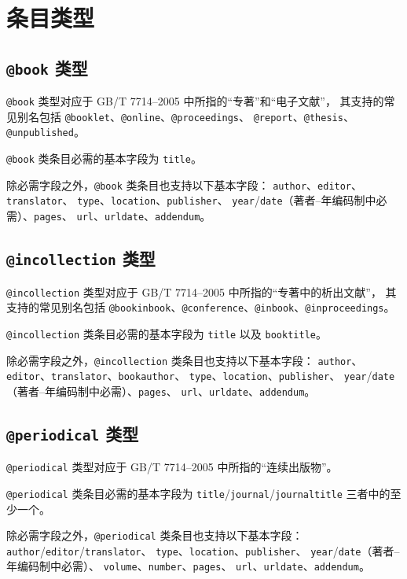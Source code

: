 \documentclass[UTF8]{ctexart}
\begin{document}
\section{条目类型}\label{sec:entries}
\subsection{\texttt{@book} 类型}

\verb|@book| 类型对应于 GB/T 7714--2005 中所指的“专著”和“电子文献”，
其支持的常见别名包括 \verb|@booklet|、\verb|@online|、\verb|@proceedings|、%
\verb|@report|、\verb|@thesis|、\verb|@unpublished|。

\verb|@book| 类条目必需的基本字段为 \verb|title|。

除必需字段之外，\verb|@book| 类条目也支持以下基本字段：%
\verb|author|、\verb|editor|、\verb|translator|、%
\verb|type|、\verb|location|、\verb|publisher|、%
\verb|year|/\verb|date|（著者--年编码制中必需）、\verb|pages|、%
\verb|url|、\verb|urldate|、\verb|addendum|。

\subsection{\texttt{@incollection} 类型}

\verb|@incollection| 类型对应于 GB/T 7714--2005 中所指的“专著中的析出文献”，
其支持的常见别名包括
\verb|@bookinbook|、\verb|@conference|、\verb|@inbook|、\verb|@inproceedings|。

\verb|@incollection| 类条目必需的基本字段为 \verb|title| 以及 \verb|booktitle|。

除必需字段之外，\verb|@incollection| 类条目也支持以下基本字段：%
\verb|author|、\verb|editor|、\verb|translator|、\verb|bookauthor|、%
\verb|type|、\verb|location|、\verb|publisher|、%
\verb|year|/\verb|date|（著者--年编码制中必需）、\verb|pages|、%
\verb|url|、\verb|urldate|、\verb|addendum|。

\subsection{\texttt{@periodical} 类型}

\verb|@periodical| 类型对应于 GB/T 7714--2005 中所指的“连续出版物”。

\verb|@periodical| 类条目必需的基本字段为
\verb|title|/\verb|journal|/\verb|journaltitle| 三者中的至少一个。

除必需字段之外，\verb|@periodical| 类条目也支持以下基本字段：%
\verb|author|/\verb|editor|/\verb|translator|、%
\verb|type|、\verb|location|、\verb|publisher|、%
\verb|year|/\verb|date|（著者--年编码制中必需）、%
\verb|volume|、\verb|number|、\verb|pages|、%
\verb|url|、\verb|urldate|、\verb|addendum|。
\end{document}
